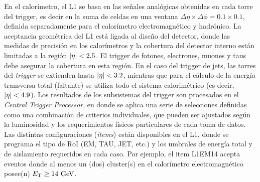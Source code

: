 En el calorímetro, el L1 se basa en las señales analógicas obtenidas en cada
torre del trigger, es decir en la suma de celdas en una ventana $\Delta \eta
\times \Delta \phi = 0.1 \times 0.1$, definida separadamente para el calorímetro
electromagnético y hadrónico. La aceptancia geométrica del L1 está ligada al
diseño del detector, donde las medidas de precisión en los calorímetros y la
cobertura del detector interno están limitadas a la región $\abseta < 2.5$. El
trigger de fotones, electrones, muones y taus debe asegurar la cobertura en esta
región. En el caso del trigger de jets, las torres del \emph{trigger} se
extienden hasta $\abseta < 3.2$, mientras que para el cálculo de la energía
transversa total (faltante) se utiliza todo el sistema calorimétrico (es decir,
$\abseta < 4.9$). Los resultados de los subsistemas del trigger son procesados
en el \emph{Central Trigger Processor}, en donde se aplica una serie de
selecciones definidas como una combinación de criterios individuales, que pueden
ser ajustados según la luminosidad y los requerimientos físicos particulares de
cada toma de datos. Las distintas configuraciones (\emph{items}) están
disponibles en el L1, donde se programa el tipo de RoI (EM, TAU, JET, etc.) y
los umbrales de energía total y de aislamiento requeridos en cada caso. Por
ejemplo, el item L1EM14 acepta eventos donde al menos un (dos) cluster(s) en el
calorímetro electromagnético posee(n) $\et \geq 14 \GeV$.

